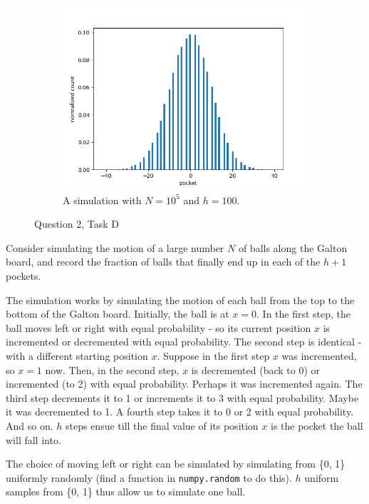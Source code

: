 \begin{tcolorbox}
\begin{figure}[H]
\begin{subfigure}[r]{0.4\textwidth}
            \includegraphics[width=\textwidth]{assets/images/q2d2.png}
            \caption{A simulation with $N = 10^5$ and $h = 100$.}
            \label{fig_q2d2}
        \end{subfigure}
        \caption{Question 2, Task D}
        \label{fig_q2d}
    \end{figure}
    
    Consider simulating the motion of a large number $N$ of balls along the Galton
    board, and record the fraction of balls that finally end up in each of the $h 
    + 1$ pockets.

    The simulation works by simulating the motion of each ball from the top to the
    bottom of the Galton board. Initially, the ball is at $x = 0$. In the first
    step, the ball moves left or right with equal probability - so its current
    position $x$ is incremented or decremented with equal probability. The second
    step is identical - with a different starting position $x$. Suppose in the
    first step $x$ was incremented, so $x = 1$ now. Then, in the second step, $x$
    is decremented (back to 0) or incremented (to 2) with equal probability.
    Perhaps it was incremented again. The third step decrements it to 1 or
    increments it to 3 with equal probability. Maybe it was decremented to 1. A
    fourth step takes it to 0 or 2 with equal probability. And so on. $h$ steps
    ensue till the final value of its position $x$ is the pocket the ball will
    fall into.
    
    The choice of moving left or right can be simulated by simulating from \{0, 
    1\} uniformly randomly (find a function in \texttt{numpy.random} to do this). 
    $h$ uniform samples from \{0, 1\} thus allow us to simulate one ball.


\end{tcolorbox}
